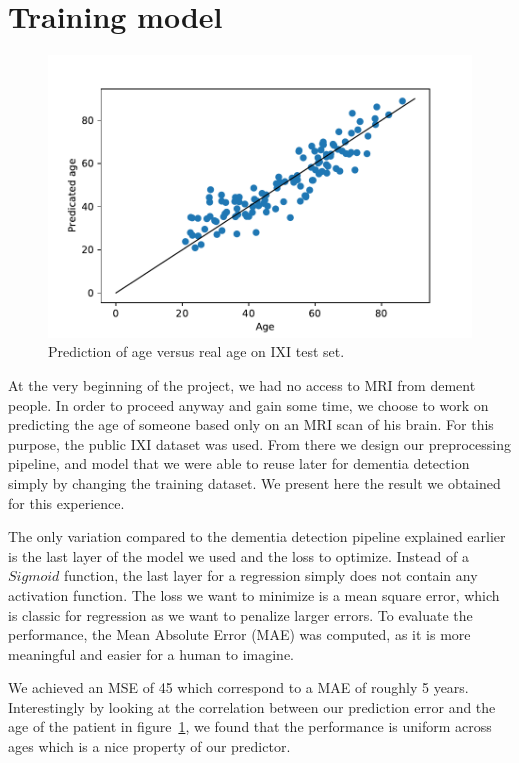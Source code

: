 \section{Training model}

\begin{figure}
 \centering
 \includegraphics[width=.9\linewidth]{figures/Age_pred_vs_age_IXI.pdf}
 \captionsetup{width=.9\linewidth}
 \caption{Prediction of age versus real age on IXI test set.}
 \label{fig:IXI_pred_vs_age}
\end{figure}

At the very beginning of the project, we had no access to MRI from dement people. In order to proceed anyway and gain some time, we choose to work on predicting the age of someone based only on an MRI scan of his brain. For this purpose, the public IXI dataset was used. From there we design our preprocessing pipeline, and model that we were able to reuse later for dementia detection simply by changing the training dataset. We present here the result we obtained for this experience.

The only variation compared to the dementia detection pipeline explained earlier is the last layer of the model we used and the loss to optimize. Instead of a $Sigmoid$ function, the last layer for a regression simply does not contain any activation function. The loss we want to minimize is a mean square error, which is classic for regression as we want to penalize larger errors. To evaluate the performance, the Mean Absolute Error (MAE) was computed, as it is more meaningful and easier for a human to imagine.


We achieved an MSE of 45 which correspond to a MAE of roughly 5 years. Interestingly by looking at the correlation between our prediction error and the age of the patient in figure~\ref{fig:IXI_pred_vs_age}, we found that the performance is uniform across ages which is a nice property of our predictor.

